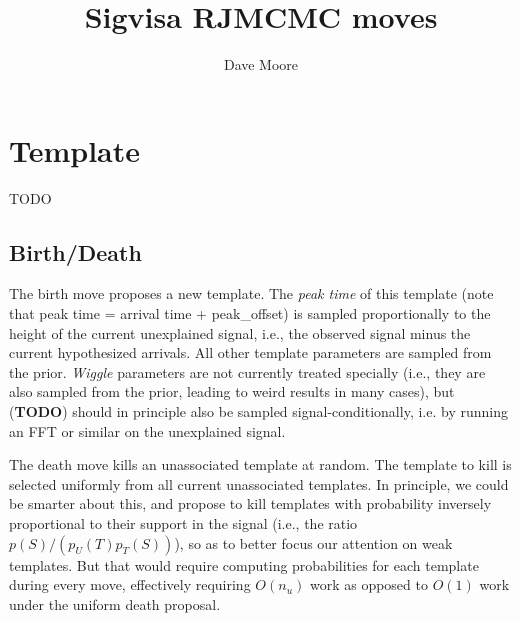\documentclass{article}
\begin{document}
\title{Sigvisa RJMCMC moves}
\author{Dave Moore}
\maketitle


\section{Template}

TODO

\subsection{Birth/Death}

The birth move proposes a new template. The {\em peak time} of this template (note that peak time = arrival time + peak\_offset) is sampled proportionally to the height of the current unexplained signal, i.e., the observed signal minus the current hypothesized arrivals. All other template parameters are sampled from the prior. {\em Wiggle} parameters are not currently treated specially (i.e., they are also sampled from the prior, leading to weird results in many cases), but ({\bf TODO}) should in principle also be sampled signal-conditionally, i.e. by running an FFT or similar on the unexplained signal. 

The death move kills an unassociated template at random. The template to kill is selected uniformly from all current unassociated templates. In principle, we could be smarter about this, and propose to kill templates with probability inversely proportional to their support in the signal (i.e., the ratio $p(S)/(p_U(T)p_T(S))$), so as to better focus our attention on weak templates. But that would require computing probabilities for each template during every move, effectively requiring $O(n_u)$ work as opposed to $O(1)$ work under the uniform death proposal. 
\end{document}
